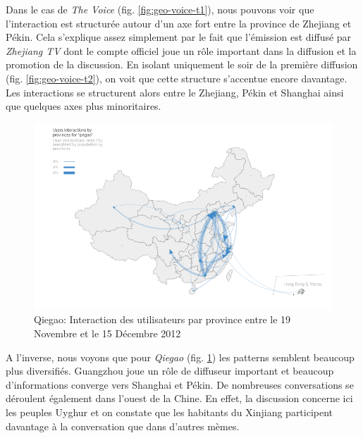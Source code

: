 Dans le cas de \textit{The Voice} (fig. \ref{fig:geo-voice-t1}), nous pouvons voir que l{\textquoteright}interaction est structurée autour d{\textquoteright}un axe fort entre la province de Zhejiang et Pékin. Cela s{\textquoteright}explique assez simplement par le fait que l{\textquoteright}émission est diffusé par \textit{Zhejiang TV} dont le compte officiel joue un r\^ole important dans la diffusion et la promotion de la discussion. En isolant uniquement le soir de la première diffusion (fig. \ref{fig:geo-voice-t2}), on voit que cette structure s{\textquoteright}accentue encore davantage. Les interactions se structurent alors entre le Zhejiang, Pékin et Shanghai ainsi que quelques axes plus minoritaires.

\begin{figure}[h!]
    \centering
    \includegraphics[scale=.35]{figures/chap4/chapitre4-img21.png}
    \caption{
      Qiegao: Interaction des utilisateurs par province entre le 19 Novembre et le 15 Décembre 2012
    }
    \label{fig:geo-qiegao-t0}
\end{figure}

A l{\textquoteright}inverse, nous voyons que pour \textit{Qiegao} (fig. \ref{fig:geo-qiegao-t0}) les patterns semblent beaucoup plus diversifiés. Guangzhou joue un r\^ole de diffuseur important et beaucoup d{\textquoteright}informations converge vers Shanghai et Pékin. De nombreuses conversations se déroulent également dans l{\textquoteright}ouest de la Chine. En effet, la discussion concerne ici les peuples Uyghur et on constate que les habitants du Xinjiang participent davantage \`a la conversation que dans d{\textquoteright}autres mèmes.  

